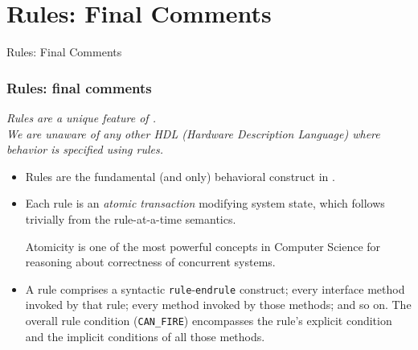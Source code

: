 
\section{Rules: Final Comments}

\begin{frame}

\begin{center}
  {\LARGE Rules: Final Comments}
\end{center}

\end{frame}


\begin{frame}[fragile]
\frametitle{Rules: final comments}

\footnotesize

 \emph{Rules are a unique feature of {\BSV}. \\
       We are unaware of any other HDL (Hardware Description Language)
       where behavior is specified using rules.}

\vspace{2ex}

\begin{itemize}
 \item Rules are the fundamental (and only) behavioral construct in {\BSV}.

 \vspace{2ex}

 \item Each rule is an \emph{atomic transaction} modifying system
       state, which follows trivially from the rule-at-a-time
       semantics.

       \vspace{1ex}

       Atomicity is one of the most powerful concepts in Computer
       Science for reasoning about correctness of concurrent systems.

 \vspace{2ex}

 \item A rule comprises a syntactic {\tt rule}-{\tt endrule}
       construct; every interface method invoked by that rule; every
       method invoked by those methods; and so on.  The overall rule
       condition ({\tt CAN\_FIRE}) encompasses the rule's explicit
       condition and the implicit conditions of all those methods.


\end{itemize}
\end{frame}
